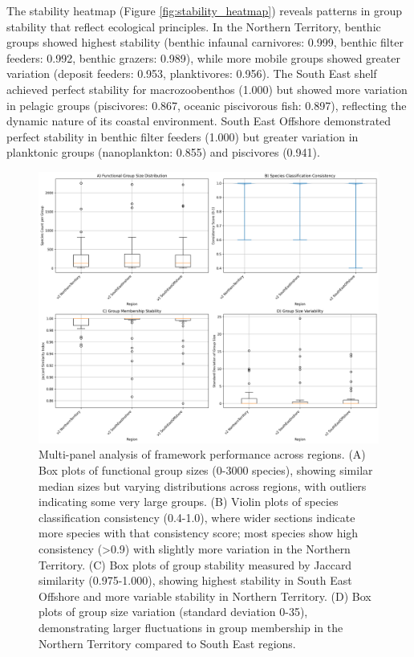 The stability heatmap (Figure \ref{fig:stability_heatmap}) reveals patterns in group stability that reflect ecological principles. In the Northern Territory, benthic groups showed highest stability (benthic infaunal carnivores: 0.999, benthic filter feeders: 0.992, benthic grazers: 0.989), while more mobile groups showed greater variation (deposit feeders: 0.953, planktivores: 0.956). The South East shelf achieved perfect stability for macrozoobenthos (1.000) but showed more variation in pelagic groups (piscivores: 0.867, oceanic piscivorous fish: 0.897), reflecting the dynamic nature of its coastal environment. South East Offshore demonstrated perfect stability in benthic filter feeders (1.000) but greater variation in planktonic groups (nanoplankton: 0.855) and piscivores (0.941).

\begin{figure}[htbp]
    \centering
    \includegraphics[width=\textwidth]{figures/regional_group_analysis.png}
    \caption{Multi-panel analysis of framework performance across regions. (A) Box plots of functional group sizes (0-3000 species), showing similar median sizes but varying distributions across regions, with outliers indicating some very large groups. (B) Violin plots of species classification consistency (0.4-1.0), where wider sections indicate more species with that consistency score; most species show high consistency (>0.9) with slightly more variation in the Northern Territory. (C) Box plots of group stability measured by Jaccard similarity (0.975-1.000), showing highest stability in South East Offshore and more variable stability in Northern Territory. (D) Box plots of group size variation (standard deviation 0-35), demonstrating larger fluctuations in group membership in the Northern Territory compared to South East regions.}
    \label{fig:regional_analysis}
\end{figure}

